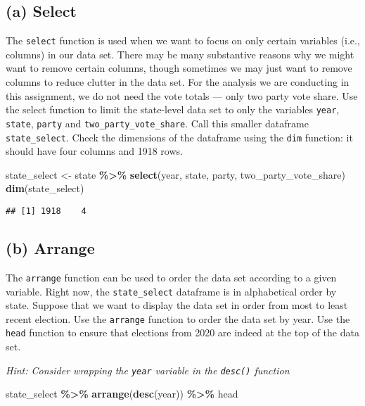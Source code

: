 \documentclass[
]{article}
\newenvironment{Shaded}{\begin{snugshade}}{\end{snugshade}}
\newcommand{\FunctionTok}[1]{\textcolor[rgb]{0.13,0.29,0.53}{\textbf{#1}}}
\newcommand{\NormalTok}[1]{#1}
\newcommand{\OtherTok}[1]{\textcolor[rgb]{0.56,0.35,0.01}{#1}}
\newcommand{\SpecialCharTok}[1]{\textcolor[rgb]{0.81,0.36,0.00}{\textbf{#1}}}
\begin{document}
\subsection{(a) Select}\label{a-select}

The \texttt{select} function is used when we want to focus on only
certain variables (i.e., columns) in our data set. There may be many
substantive reasons why we might want to remove certain columns, though
sometimes we may just want to remove columns to reduce clutter in the
data set. For the analysis we are conducting in this assignment, we do
not need the vote totals --- only two party vote share. Use the select
function to limit the state-level data set to only the variables
\texttt{year}, \texttt{state}, \texttt{party} and
\texttt{two\_party\_vote\_share}. Call this smaller dataframe
\texttt{state\_select}. Check the dimensions of the dataframe using the
\texttt{dim} function: it should have four columns and 1918 rows.

\begin{Shaded}
\begin{Highlighting}[]
\NormalTok{state\_select }\OtherTok{\textless{}{-}}\NormalTok{ state }\SpecialCharTok{\%\textgreater{}\%}
  \FunctionTok{select}\NormalTok{(year, state, party, two\_party\_vote\_share)}
\FunctionTok{dim}\NormalTok{(state\_select)}
\end{Highlighting}
\end{Shaded}

\begin{verbatim}
## [1] 1918    4
\end{verbatim}

\subsection{(b) Arrange}\label{b-arrange}

The \texttt{arrange} function can be used to order the data set
according to a given variable. Right now, the \texttt{state\_select}
dataframe is in alphabetical order by state. Suppose that we want to
display the data set in order from most to least recent election. Use
the \texttt{arrange} function to order the data set by year. Use the
\texttt{head} function to ensure that elections from 2020 are indeed at
the top of the data set.

\emph{Hint: Consider wrapping the \texttt{year} variable in the
\texttt{desc()} function}

\begin{Shaded}
\begin{Highlighting}[]
\NormalTok{state\_select }\SpecialCharTok{\%\textgreater{}\%}
  \FunctionTok{arrange}\NormalTok{(}\FunctionTok{desc}\NormalTok{(year)) }\SpecialCharTok{\%\textgreater{}\%}
\NormalTok{  head}
\end{Highlighting}
\end{Shaded}
\end{document}
